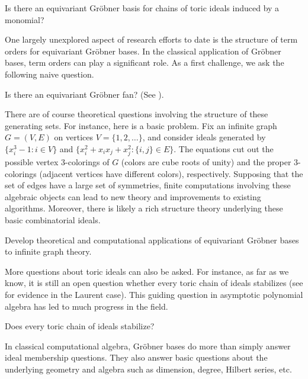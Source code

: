 \begin{question}
Is there an equivariant Gr\"obner basis for chains of toric ideals induced by a monomial?
\end{question}

One largely unexplored aspect of research efforts to date is the structure of term orders for equivariant Gr\"obner bases.  In the classical application of Gr\"obner bases, term orders can play a significant role.  As a first challenge, we ask the following naive question.

\begin{question}
Is there an equivariant Gr\"obner fan?  (See \cite{sturmfels1996grobner}).
\end{question}

There are of course theoretical questions involving the structure of these generating sets.  For instance, here is a basic problem.  Fix an infinite graph $G = (V,E)$ on vertices $V = \{1,2,\ldots\}$, and consider ideals generated by $\{x_i^3-1: i \in V\}$ and $\{x_i^2 + x_i x_j +x_j^2: \{i,j\} \in E\}$.  The equations cut out the possible vertex $3$-colorings of $G$ (colors are cube roots of unity) and the proper $3$-colorings (adjacent vertices have different colors), respectively.  Supposing that the set of edges have a large set of symmetries, finite computations involving these algebraic objects can lead to new theory and improvements to existing algorithms.  Moreover, there is likely a rich structure theory underlying these basic combinatorial ideals.

\begin{problem}\label{graphprob}
Develop theoretical and computational applications of equivariant Gr\"obner bases to infinite graph theory.
\end{problem}

More questions about toric ideals can also be asked.  For instance, as far as we know, it is still an open question whether every toric chain of ideals stabilizes (see \cite{Hillar13} for evidence in the Laurent case).  This guiding question in asymptotic polynomial algebra has led to much progress in the field.

\begin{question}
Does every toric chain of ideals stabilize?
\end{question}

In classical computational algebra, Gr\"obner bases do more than simply answer ideal membership questions.  They also answer basic questions about the underlying geometry and algebra such as dimension, degree, Hilbert series, etc.  

